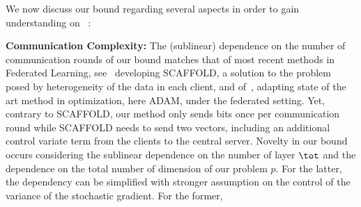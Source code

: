 \documentclass[11pt]{article}
\begin{document}





We now discuss our bound regarding several aspects in order to gain understanding on \algo\ :

\textbf{Communication Complexity:} The (sublinear) dependence on the number of communication rounds of our bound matches that of most recent methods in Federated Learning, see~\citep{karimireddy2019scaffold} developing SCAFFOLD, a solution to the problem posed by heterogeneity of the data in each client, and of~\citep{reddi2020adaptive}, adapting state of the art method in optimization, here ADAM, under the federated setting. 
Yet, contrary to SCAFFOLD, our method only sends bits once per communication round while SCAFFOLD needs to send two vectors, including an additional control variate term  from the clients to the central server.
Novelty in our bound occurs considering the sublinear dependence on the number of layer $\tot$ and the dependence on the total number of dimension of our problem $p$. For the latter, the dependency can be simplified with stronger assumption on the control of the variance of the stochastic gradient. For the former, 
\end{document}
